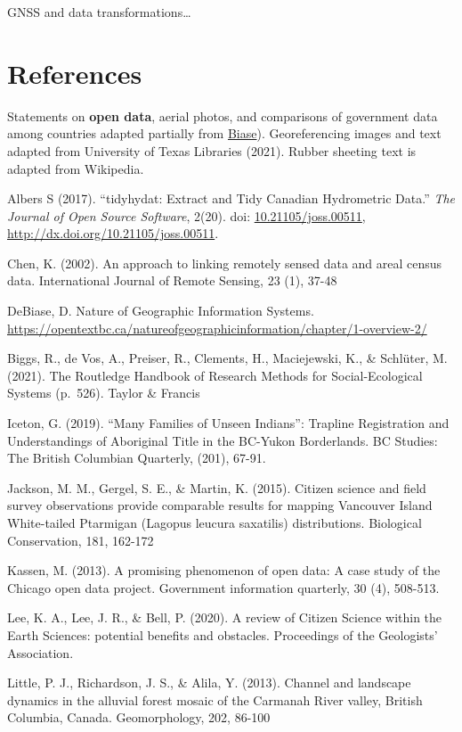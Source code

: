 \documentclass[
]{book}
\begin{document}
GNSS and data transformations\ldots{}

\hypertarget{references}{%
\section{References}\label{references}}

Statements on \textbf{open data}, aerial photos, and comparisons of government data among countries adapted partially from \href{https://opentextbc.ca/natureofgeographicinformation/chapter/1-overview-2/}{Biase}). Georeferencing images and text adapted from University of Texas Libraries (2021). Rubber sheeting text is adapted from Wikipedia.

Albers S (2017). ``tidyhydat: Extract and Tidy Canadian Hydrometric Data.'' \emph{The Journal of Open Source Software}, 2(20). doi: \href{https://doi.org/10.21105/joss.00511}{10.21105/joss.00511}, \url{http://dx.doi.org/10.21105/joss.00511}.

Chen, K. (2002). An approach to linking remotely sensed data and areal census data. International Journal of Remote Sensing, 23 (1), 37-48

DeBiase, D. Nature of Geographic Information Systems. \url{https://opentextbc.ca/natureofgeographicinformation/chapter/1-overview-2/}

Biggs, R., de Vos, A., Preiser, R., Clements, H., Maciejewski, K., \& Schlüter, M. (2021). The Routledge Handbook of Research Methods for Social-Ecological Systems (p.~526). Taylor \& Francis

Iceton, G. (2019). ``Many Families of Unseen Indians'': Trapline Registration and Understandings of Aboriginal Title in the BC-Yukon Borderlands. BC Studies: The British Columbian Quarterly, (201), 67-91.

Jackson, M. M., Gergel, S. E., \& Martin, K. (2015). Citizen science and field survey observations provide comparable results for mapping Vancouver Island White-tailed Ptarmigan (Lagopus leucura saxatilis) distributions. Biological Conservation, 181, 162-172

Kassen, M. (2013). A promising phenomenon of open data: A case study of the Chicago open data project. Government information quarterly, 30 (4), 508-513.

Lee, K. A., Lee, J. R., \& Bell, P. (2020). A review of Citizen Science within the Earth Sciences: potential benefits and obstacles. Proceedings of the Geologists' Association.

Little, P. J., Richardson, J. S., \& Alila, Y. (2013). Channel and landscape dynamics in the alluvial forest mosaic of the Carmanah River valley, British Columbia, Canada. Geomorphology, 202, 86-100
\end{document}
